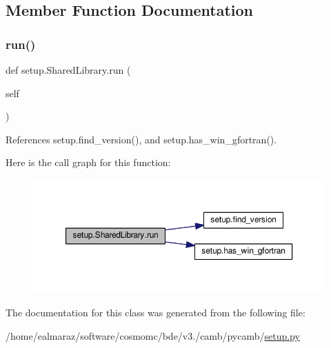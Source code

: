\subsection{Member Function Documentation}
\mbox{\label{classsetup_1_1SharedLibrary_abebc0f98b630cdcaa06069569f94b61b}} 
\subsubsection{\texorpdfstring{run()}{run()}}
{\footnotesize\ttfamily def setup.\+Shared\+Library.\+run (\begin{DoxyParamCaption}\item[{}]{self }\end{DoxyParamCaption})}



References setup.\+find\+\_\+version(), and setup.\+has\+\_\+win\+\_\+gfortran().

Here is the call graph for this function\+:
\nopagebreak
\begin{figure}[H]
\begin{center}
\leavevmode
\includegraphics[width=350pt]{classsetup_1_1SharedLibrary_abebc0f98b630cdcaa06069569f94b61b_cgraph}
\end{center}
\end{figure}


The documentation for this class was generated from the following file\+:\begin{DoxyCompactItemize}
\item 
/home/ealmaraz/software/cosmomc/bde/v3./camb/pycamb/\mbox{\hyperlink{camb_2pycamb_2setup_8py}{setup.\+py}}\end{DoxyCompactItemize}
